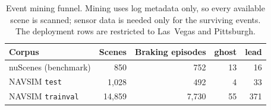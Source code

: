 \begin{table}[t]
\centering
\setlength{\tabcolsep}{4pt}
\footnotesize
\caption{Event mining funnel. Mining uses log metadata only, so every available scene is scanned; sensor data is needed only for the surviving events. The deployment rows are restricted to Las~Vegas and Pittsburgh.}
\label{tab:corpora}
\begin{tabular}{lrrrr}
\toprule
Corpus & Scenes & Braking episodes & ghost & lead\\
\midrule
nuScenes (benchmark) & 850 & 752 & 13 & 16\\
NAVSIM \texttt{test} & 1,028 & 492 & 4 & 33\\
NAVSIM \texttt{trainval} & 14,859 & 7,730 & 55 & 371\\
\bottomrule
\end{tabular}
\end{table}
